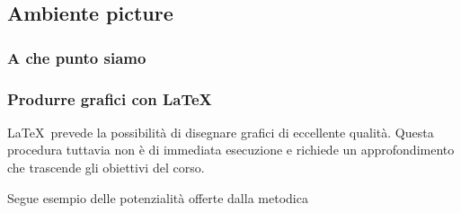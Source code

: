 \documentclass[svgnames,%
	ucs,%
	pdftex]{guitbeamer}
\begin{document}
\subsection{Ambiente picture}
\begin{frame}
  \frametitle{A che punto siamo}
\end{frame}
\begin{frame}
  \frametitle{Produrre grafici con \LaTeX}
	\LaTeX\ prevede la possibilit\`a di disegnare grafici di eccellente qualit\`a. Questa procedura tuttavia non \`e di immediata esecuzione e richiede un approfondimento che trascende gli obiettivi del corso.\newline

  \medskip
	Segue esempio delle potenzialit\`a offerte dalla metodica 
\end{frame}
\end{document}

